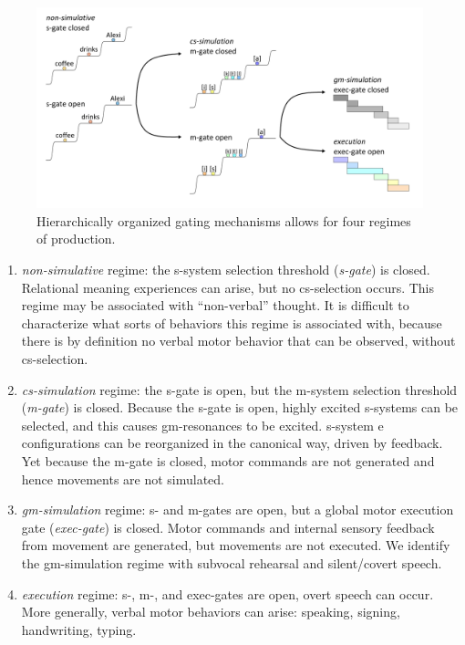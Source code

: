  
\begin{figure}
\includegraphics[width=\textwidth]{figures/Tilsen-img56.png}
\caption{Hierarchically organized gating mechanisms allows for four regimes of production.}
\label{fig:4:6}
\end{figure}
 
\begin{enumerate}
\item \textit{non-simulative} regime: the s-system selection threshold (\textit{s-gate}) is closed. Relational meaning experiences can arise, but no cs-selection occurs. This regime may be associated with “non-verbal” thought. It is difficult to characterize what sorts of behaviors this regime is associated with, because there is by definition no verbal motor behavior that can be observed, without cs-selection. 

\item \textit{cs-simulation} regime: the s-gate is open, but the m-system selection threshold (\textit{m-gate}) is closed. Because the s-gate is open, highly excited s-systems can be selected, and this causes gm-resonances to be excited. s-system e configurations can be reorganized in the canonical way, driven by feedback. Yet because the m-gate is closed, motor commands are not generated and hence movements are not simulated. 

\item \textit{gm-simulation} regime: s- and m-gates are open,  but a global motor execution gate (\textit{exec-gate}) is closed. Motor commands and internal sensory feedback from movement are generated, but movements are not executed. We identify the gm-simulation regime with subvocal rehearsal and silent/covert speech. 

\item \textit{execution} regime: s-, m-, and exec-gates are open, overt speech can occur. More generally, verbal motor behaviors can arise: speaking, signing, handwriting, typing.
\end{enumerate}

